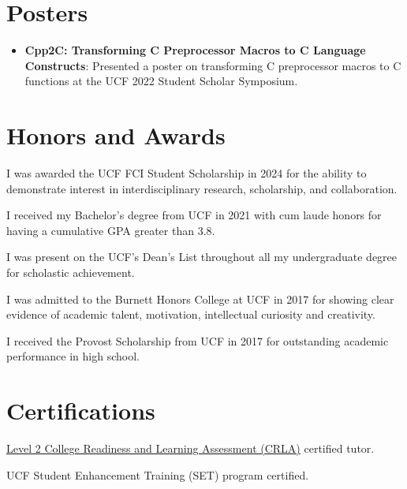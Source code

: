 \documentclass{article}
\newcommand{\resumeItem}[2]{
  \item\small{
    \textbf{#1}{: #2 \vspace{-2pt}}
  }
}
\newcommand{\resumeSubItem}[2]{\resumeItem{#1}{#2}\vspace{-3pt}}
\newcommand{\resumeSubHeadingListStart}{\begin{itemize}[leftmargin=*, label={}]}
\newcommand{\resumeSubHeadingListEnd}{\end{itemize}}
\begin{document}
\vspace{-5pt}
\section{Posters}
\resumeSubHeadingListStart{}
\resumeSubItem{Cpp2C\@: Transforming C Preprocessor Macros to C Language Constructs}
{Presented a poster on transforming C preprocessor macros to C functions at the UCF 2022 Student Scholar Symposium.}
\resumeSubHeadingListEnd{}

\vspace{-5pt}
\section{Honors and Awards}
\begin{description}[font=$\bullet$]
	\item {I was awarded the UCF FCI Student Scholarship in 2024 for the ability to demonstrate interest in interdisciplinary research, scholarship, and collaboration.}
	\vspace{-5pt}
	\item {I received my Bachelor's degree from UCF in 2021 with cum laude honors for having a cumulative GPA greater than 3.8.}
	\vspace{-5pt}
	\item {I was present on the UCF's Dean's List throughout all my undergraduate degree for scholastic achievement.}
	\vspace{-5pt}
	\item {I was admitted to the Burnett Honors College at UCF in 2017 for showing clear evidence of academic talent, motivation, intellectual curiosity and creativity.}
	\vspace{-5pt}
	\item {I received the Provost Scholarship from UCF in 2017 for outstanding academic performance in high school.}
\end{description}

\vspace{-5pt}
\section{Certifications}
\begin{description}[font=$\bullet$]
	\item {\href{https://drive.google.com/file/d/1idZ5hhQQF4f-ZRQCBUplQTGU9YjS7fUs/view?usp=sharing}{Level 2 College Readiness and Learning Assessment (CRLA)} certified tutor.}
	      \vspace{-5pt}
	\item {UCF Student Enhancement Training (SET) program certified.}
\end{description}
\end{document}
